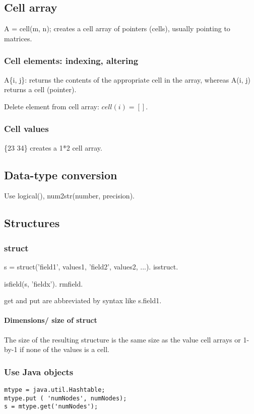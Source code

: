 \documentclass[oneside, article]{memoir}
\begin{document}
\subsection{Cell array}
A = cell(m, n); creates a cell array of pointers (cells), usually pointing to matrices.

\subsubsection{Cell elements: indexing, altering}
A\{i, j\}: returns the contents of the appropriate cell in the array, whereas A(i, j) returns a cell (pointer).

Delete element from cell array: $cell(i) = []$.


\subsubsection{Cell values}
\{23 34\} creates a 1*2 cell array.

\subsection{Data-type conversion}
Use logical(), num2str(number, precision).

\subsection{Structures}
\subsubsection{struct}
s = struct('field1', values1, 'field2', values2, ...). isstruct.

isfield(s, 'fieldx'). rmfield. 

get and put are abbreviated by syntax like s.field1. 

\paragraph*{Dimensions/ size of struct}
The size of the resulting structure is the same size as the value cell arrays or 1-by-1 if none of the values is a cell.

\subsubsection{Use Java objects}
\begin{verbatim}
mtype = java.util.Hashtable;
mtype.put ( 'numNodes', numNodes);
s = mtype.get('numNodes');
\end{verbatim}
\end{document}
